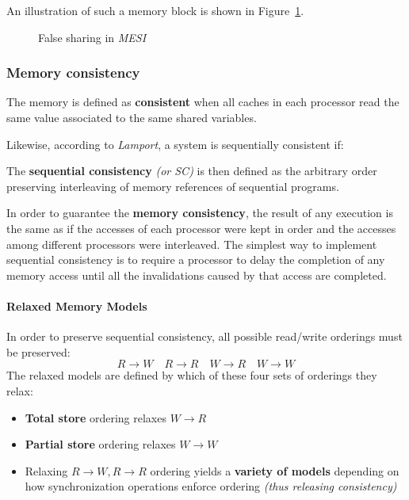 \documentclass[english]{article}
\begin{document}
\bigskip
An illustration of such a memory block is shown in Figure~\ref{fig:MESI-false-sharing}.

\begin{figure}[htbp]
  \centering
  \bigskip
  \caption{False sharing in \textit{MESI}}
  \label{fig:MESI-false-sharing}
  \bigskip
\end{figure}

\subsubsection{Memory consistency}

The memory is defined as \textbf{consistent} when all caches in each processor read the same value associated to the same shared variables.

Likewise, according to \textit{Lamport}, a system is sequentially consistent if:


The \textbf{sequential consistency} \textit{(or SC)} is then defined as the arbitrary order preserving interleaving of memory references of sequential programs.

\bigskip
In order to guarantee the \textbf{memory consistency}, the result of any execution is the same as if the accesses of each processor were kept in order and the accesses among different processors were interleaved.
The simplest way to implement sequential consistency is to require a processor to delay the completion of any memory access until all the invalidations caused by that access are completed.

\paragraph{Relaxed Memory Models}

In order to preserve sequential consistency, all possible read/write orderings must be preserved:
\[R \rightarrow W \quad R \rightarrow R \quad W \rightarrow R \quad W \rightarrow W\]
The relaxed models are defined by which of these four sets of orderings they relax:

\begin{itemize}
  \item \textbf{Total store} ordering relaxes \(W \rightarrow R\)
  \item \textbf{Partial store} ordering relaxes \(W \rightarrow W\)
  \item Relaxing \(R \rightarrow W, R \rightarrow R\) ordering yields a \textbf{variety of models} depending on how synchronization operations enforce ordering \textit{(thus releasing consistency)}
\end{itemize}
\end{document}
